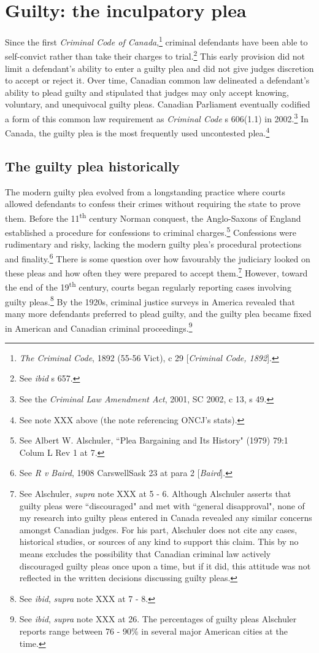 \section{Guilty: the inculpatory plea}

Since the first \textit{Criminal Code of Canada},\footnote{\textit{The Criminal Code}, 1892 (55-56 Vict), c 29 [\textit{Criminal Code, 1892}].} criminal defendants have been able to self-convict rather than take their charges to trial.\footnote{See \textit{ibid} s 657.} This early provision did not limit a defendant's ability to enter a guilty plea and did not give judges discretion to accept or reject it. Over time, Canadian common law delineated a defendant's ability to plead guilty and stipulated that judges may only accept knowing, voluntary, and unequivocal guilty pleas. Canadian Parliament eventually codified a form of this common law requirement as \textit{Criminal Code} s 606(1.1) in 2002.\footnote{See the \textit{Criminal Law Amendment Act}, 2001, SC 2002, c 13, s 49.} In Canada, the guilty plea is the most frequently used uncontested plea.\footnote{See note XXX above (the note referencing ONCJ's stats).}

\subsection{The guilty plea historically}

The modern guilty plea evolved from a longstanding practice where courts allowed defendants to confess their crimes without requiring the state to prove them. Before the 11\textsuperscript{th} century Norman conquest, the Anglo-Saxons of England established a procedure for confessions to criminal charges.\footnote{See Albert W. Alschuler, ``Plea Bargaining and Its History" (1979) 79:1 Colum L Rev 1 at 7.} Confessions were rudimentary and risky, lacking the modern guilty plea's procedural protections and finality.\footnote{See \textit{R v Baird}, 1908 CarswellSask 23 at para 2 [\textit{Baird}].} There is some question over how favourably the judiciary looked on these pleas and how often they were prepared to accept them.\footnote{See Alschuler, \textit{supra} note XXX at 5 - 6. Although Alschuler asserts that guilty pleas were ``discouraged" and met with ``general disapproval", none of my research into guilty pleas entered in Canada revealed any similar concerns amongst Canadian judges. For his part, Alschuler does not cite any cases, historical studies, or sources of any kind to support this claim. This by no means excludes the possibility that Canadian criminal law actively discouraged guilty pleas once upon a time, but if it did, this attitude was not reflected in the written decisions discussing guilty pleas.} However, toward the end of the 19\textsuperscript{th} century, courts began regularly reporting cases involving guilty pleas.\footnote{See \textit{ibid}, \textit{supra} note XXX at 7 - 8.} By the 1920s, criminal justice surveys in America revealed that many more defendants preferred to plead guilty, and the guilty plea became fixed in American and Canadian criminal proceedings.\footnote{See \textit{ibid}, \textit{supra} note XXX at 26. The percentages of guilty pleas Alschuler reports range between 76 - 90\% in several major American cities at the time.}

